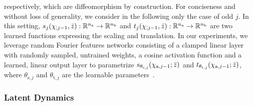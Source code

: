 respectively, which are diffeomorphism by construction.
%
For conciseness and without loss of generality, we consider in the following only the case of odd $j$.
In this setting, $s_j(\chi_{\dot, j-1}, \Bar{z}): \mathbb{R}^{n_\mathrm{a}} \to \mathbb{R}^{n_\mathrm{b}}$ and $t_j(\chi_{\dot, j-1}, \Bar{z}): \mathbb{R}^{n_\mathrm{a}} \to \mathbb{R}^{n_\mathrm{b}}$ are two learned functions expressing the scaling and translation.
In our experiments, we leverage random Fourier features networks consisting of a clamped linear layer with randomly sampled, untrained weights, a cosine activation function and a learned, linear output layer to parametrize $s_{\theta_{\mathrm{s},j}}(\chi_{\mathrm{a}, j-1}; \Bar{z})$ and $t_{\theta_{\mathrm{t},j}}(\chi_{\mathrm{a}, j-1}; \Bar{z})$, where $\theta_{\mathrm{s},j}$ and $\theta_{\mathrm{t},j}$ are the learnable parameters~\citep{rana2020euclideanizing}.

\subsubsection{Latent Dynamics}

